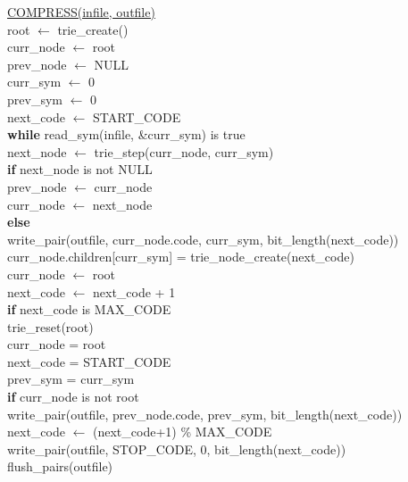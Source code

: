 \documentclass[12pt]{article}
\begin{document}
\underline{COMPRESS(infile, outfile)} \\
\indent root $\leftarrow$ trie\_create() \\
\indent curr\_node $\leftarrow$ root \\
\indent prev\_node $\leftarrow$ NULL \\
\indent curr\_sym $\leftarrow$ 0 \\
\indent prev\_sym $\leftarrow$ 0 \\
\indent next\_code $\leftarrow$ START\_CODE \\
\indent \textbf{while} read\_sym(infile, \&curr\_sym) is true \\
\indent \indent next\_node $\leftarrow$ trie\_step(curr\_node, curr\_sym) \\
\indent \indent \textbf{if} next\_node is not NULL \\
\indent \indent \indent prev\_node $\leftarrow$ curr\_node \\
\indent \indent \indent curr\_node $\leftarrow$ next\_node \\
\indent \indent \textbf{else} \\
\indent \indent \indent write\_pair(outfile, curr\_node.code, curr\_sym, bit\_length(next\_code)) \\
\indent \indent \indent curr\_node.children[curr\_sym] = trie\_node\_create(next\_code) \\
\indent \indent \indent curr\_node $\leftarrow$ root \\
\indent \indent \indent next\_code $\leftarrow$ next\_code + 1 \\
\indent \indent \textbf{if} next\_code is MAX\_CODE \\
\indent \indent \indent trie\_reset(root) \\
\indent \indent \indent curr\_node = root \\
\indent \indent \indent next\_code = START\_CODE \\
\indent \indent \indent prev\_sym = curr\_sym \\
\indent \textbf{if} curr\_node is not root \\
\indent \indent write\_pair(outfile, prev\_node.code, prev\_sym, bit\_length(next\_code)) \\
\indent \indent next\_code $\leftarrow$ (next\_code+1) \% MAX\_CODE \\
\indent write\_pair(outfile, STOP\_CODE, 0, bit\_length(next\_code)) \\
\indent flush\_pairs(outfile) \\
\\
\end{document}
